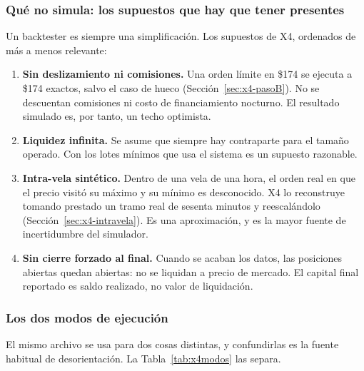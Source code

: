 \documentclass[11pt,a4paper]{article}
\begin{document}
\subsubsection{Qué no simula: los supuestos que hay que tener presentes}

Un backtester es siempre una simplificación. Los supuestos de X4, ordenados de más a menos
relevante:

\begin{enumerate}[leftmargin=1.6em,itemsep=3pt]
\item \textbf{Sin deslizamiento ni comisiones.} Una orden límite en \$174 se ejecuta a
\$174 exactos, salvo el caso de hueco (Sección~\ref{sec:x4-pasoB}). No se descuentan
comisiones ni costo de financiamiento nocturno. El resultado simulado es, por tanto, un
techo optimista.
\item \textbf{Liquidez infinita.} Se asume que siempre hay contraparte para el tamaño
operado. Con los lotes mínimos que usa el sistema es un supuesto razonable.
\item \textbf{Intra-vela sintético.} Dentro de una vela de una hora, el orden real en que
el precio visitó su máximo y su mínimo es desconocido. X4 lo reconstruye tomando prestado
un tramo real de sesenta minutos y reescalándolo (Sección~\ref{sec:x4-intravela}). Es una
aproximación, y es la mayor fuente de incertidumbre del simulador.
\item \textbf{Sin cierre forzado al final.} Cuando se acaban los datos, las posiciones
abiertas quedan abiertas: no se liquidan a precio de mercado. El capital final reportado es
saldo realizado, no valor de liquidación.
\end{enumerate}

\subsubsection{Los dos modos de ejecución}
\label{sec:x4-modos}

El mismo archivo se usa para dos cosas distintas, y confundirlas es la fuente habitual de
desorientación. La Tabla~\ref{tab:x4modos} las separa.
\end{document}
